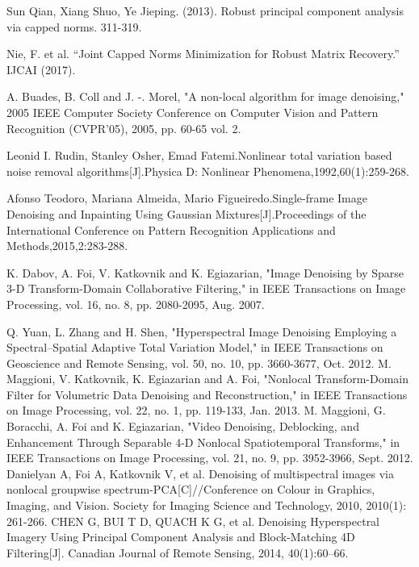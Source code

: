 \documentclass[12pt, a4paper]{article}
\begin{document}
\begin{thebibliography}{99}
Sun Qian, Xiang Shuo, Ye Jieping. (2013). Robust principal component analysis via capped norms. 311-319. %
		
Nie, F. et al. “Joint Capped Norms Minimization for Robust Matrix Recovery.” IJCAI (2017).
		
A. Buades, B. Coll and J. -. Morel, "A non-local algorithm for image denoising," 2005 IEEE Computer Society Conference on Computer Vision and Pattern Recognition (CVPR'05), 2005, pp. 60-65 vol. 2. %
		
Leonid I. Rudin, Stanley Osher, Emad Fatemi.Nonlinear total variation based noise removal algorithms[J].Physica D: Nonlinear Phenomena,1992,60(1):259-268.
		
Afonso Teodoro, Mariana Almeida, Mario Figueiredo.Single-frame Image Denoising and Inpainting Using Gaussian Mixtures[J].Proceedings of the International Conference on Pattern Recognition Applications and Methods,2015,2:283-288.
		
K. Dabov, A. Foi, V. Katkovnik and K. Egiazarian, "Image Denoising by Sparse 3-D Transform-Domain Collaborative Filtering," in IEEE Transactions on Image Processing, vol. 16, no. 8, pp. 2080-2095, Aug. 2007. %
		
Q. Yuan, L. Zhang and H. Shen, "Hyperspectral Image Denoising Employing a Spectral–Spatial Adaptive Total Variation Model," in IEEE Transactions on Geoscience and Remote Sensing, vol. 50, no. 10, pp. 3660-3677, Oct. 2012. %
M. Maggioni, V. Katkovnik, K. Egiazarian and A. Foi, "Nonlocal Transform-Domain Filter for Volumetric Data Denoising and Reconstruction," in IEEE Transactions on Image Processing, vol. 22, no. 1, pp. 119-133, Jan. 2013. %
M. Maggioni, G. Boracchi, A. Foi and K. Egiazarian, "Video Denoising, Deblocking, and Enhancement Through Separable 4-D Nonlocal Spatiotemporal Transforms," in IEEE Transactions on Image Processing, vol. 21, no. 9, pp. 3952-3966, Sept. 2012. %
Danielyan A, Foi A, Katkovnik V, et al. Denoising of multispectral images via nonlocal groupwise spectrum-PCA[C]//Conference on Colour in Graphics, Imaging, and Vision. Society for Imaging Science and Technology, 2010, 2010(1): 261-266.
CHEN G, BUI T D, QUACH K G, et al. Denoising Hyperspectral Imagery Using Principal Component Analysis and Block-Matching 4D Filtering[J]. Canadian Journal of Remote Sensing, 2014, 40(1):60–66.
		

\end{thebibliography}
\end{document}
